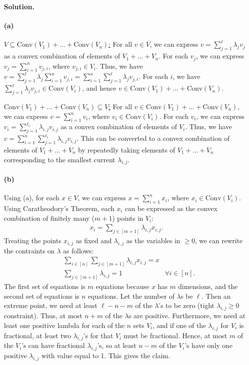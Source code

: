 \documentclass[11pt,letterpaper]{article}
\theoremstyle{definition}
\newcommand{\Conv}{\mathrm{Conv}}
\newcommand{\solution}{\medskip\noindent\textbf{Solution.}\par\medskip}
\begin{document}
\solution

\paragraph{(a)}

\ul{$V\subseteq \Conv(V_1) + \ldots + \Conv(V_n)$:} 
For all $v\in V$, we can express $v = \sum_{j=1}^\ell \lambda_j v_j$ as a convex combination of elements of $V_1 + \dots + V_n$.
For each $v_j$, we can express $v_j = \sum_{i=1}^n v_{j,i}$, where $v_{j,i}\in V_i$.
Thus, we have $v = \sum_{j=1}^\ell \lambda_j \sum_{i=1}^n v_{j,i} = \sum_{i=1}^n \sum_{j=1}^\ell \lambda_j v_{j,i}$.
For each $i$, we have $\sum_{j=1}^\ell \lambda_j v_{j,i} \in \Conv(V_i)$, and hence $v\in \Conv(V_1) + \ldots + \Conv(V_n)$.

\ul{$\Conv(V_1) + \ldots + \Conv(V_n) \subseteq V$:} 
For all $v\in \Conv(V_1) + \ldots + \Conv(V_n)$, we can express $v = \sum_{i=1}^n v_i$, where $v_i\in \Conv(V_i)$.
For each $v_i$, we can express $v_i = \sum_{j=1}^{\ell_i} \lambda_{i,j} v_{i,j}$ as a convex combination of elements of $V_i$.
Thus, we have $v = \sum_{i=1}^n \sum_{j=1}^{\ell_i} \lambda_{i,j} v_{i,j}$.
This can be converted to a convex combination of elements of $V_1 + \dots + V_n$ by repeatedly taking elements of $V_1 + \dots + V_n$ corresponding to the smallest current $\lambda_{i,j}$.

\paragraph{(b)}
Using (a), for each $x\in V$, we can express $x = \sum_{i=1}^n x_i$, where $x_i\in \Conv(V_i)$.
Using Caratheodory's Theorem, each $x_i$ can be expressed as the convex combination of finitely many ($m+1$) points in $V_i$:
\begin{align*}
    x_i = \sum_{j\in [m+1]}\lambda_{i,j} x_{i,j}.
\end{align*}
Treating the points $x_{i,j}$ as fixed and $\lambda_{i,j}$ as the variables in $\geq 0$, we can rewrite the contraints on $\lambda$ as follows:
\begin{align*}
    &\sum_{i\in[n]}\sum_{j\in [m+1]} \lambda_{i,j}x_{i,j} = x\\
    &\sum_{j\in[m+1]}\lambda_{i,j} = 1 &\forall i\in [n].
\end{align*}
The first set of equations is $m$ equations because $x$ has $m$ dimensions, and the second set of equations is $n$ equations.
Let the number of $\lambda$s be $\ell$. 
Then an extreme point, we need at least $\ell - n - m$ of the $\lambda$'s to be zero (tight $\lambda_{i,j}\geq 0$ constraint).
Thus, at most $n+m$ of the $\lambda$s are positive.
Furthermore, we need at least one positive lambda for each of the $n$ sets $V_i$, and if one of the $\lambda_{i,j}$ for $V_i$ is fractional, at least two $\lambda_{i,j}$'s for that $V_i$ must be fractional.
Hence, at most $m$ of the $V_i$'s can have fractional $\lambda_{i,j}$'s, so at least $n-m$ of the $V_i$'s have only one positive $\lambda_{i,j}$ with value equal to 1.
This gives the claim.
\end{document}
